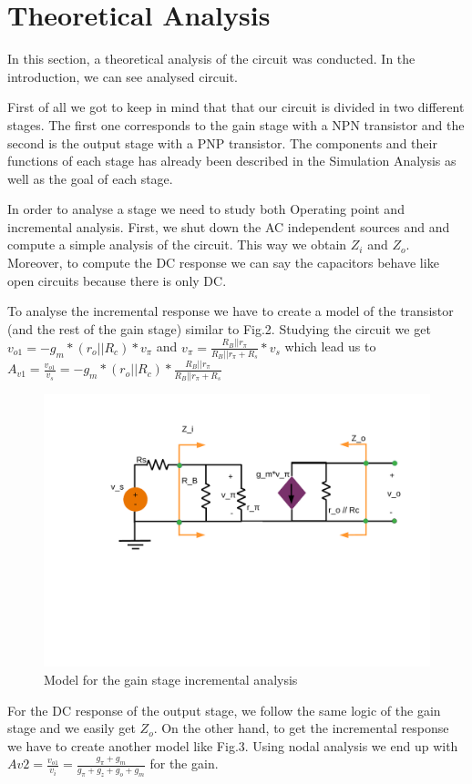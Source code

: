 \section{Theoretical Analysis} \label{section:theo}


\par In this section, a theoretical analysis of the circuit was conducted. In the introduction, we can see analysed circuit.

First of all we got to keep in mind that that our circuit is divided in two different stages. The first one corresponds to the gain stage with a NPN transistor and the second is the output stage with a PNP transistor. The components and their functions of each stage has already been described in the Simulation Analysis as well as the goal of each stage.

In order to analyse a stage we need to study both Operating point and incremental analysis.
First, we shut down the AC independent sources and  and compute a simple analysis of the circuit. This way we obtain $Z_i$ and $Z_o$. Moreover, to compute the DC response we can say the capacitors behave like open circuits because there is only DC.

To analyse the incremental response we have to create a model of the transistor (and the rest of the gain stage) similar to Fig.2. Studying the circuit we get $v_{o1}=-g_m * (r_o||R_c) * v_{\pi}$ and $v_{\pi}= \frac{R_B||r_{\pi}}{R_B||r_{\pi}+R_s} * v_s $ which lead us to $A_{v1} = \frac{v_{o1}}{v_s} = -g_m * (r_o||R_c)*\frac{R_B||r_{\pi}}{R_B||r_{\pi}+R_s}$


\begin{figure}[h] \centering
\includegraphics[width=0.65\linewidth]{Incremental_Gain.pdf}
\caption{Model for the gain stage incremental analysis}
\label{sdf}
\end{figure}

For the DC response of the output stage, we follow the same logic of the gain stage and we easily get $Z_o$. On the other hand, to get the incremental response we have to create another model like Fig.3. Using nodal analysis we end up with $A{v2} = \frac{v_{o1}}{v_i} = \frac{g_{\pi} + g_m }{g_{\pi}+g_z+g_o+g_m}$ for the gain.



